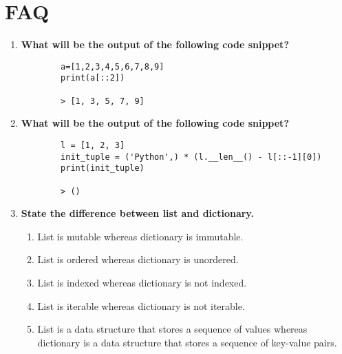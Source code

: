 \documentclass[11pt]{article}
\begin{document}
\clearpage

\section{FAQ}

\begin{enumerate}
	\item \textbf{What will be the output of the following code snippet?}\\
	      \begin{verbatim}
		a=[1,2,3,4,5,6,7,8,9]
		print(a[::2])

		> [1, 3, 5, 7, 9]
	\end{verbatim}
	\item \textbf{What will be the output of the following code snippet?}\\
	      \begin{verbatim}
		l = [1, 2, 3]
		init_tuple = ('Python',) * (l.__len__() - l[::-1][0])
		print(init_tuple)

		> ()
	\end{verbatim}

	\item \textbf{State the difference between list and dictionary.}\\
	      \begin{enumerate}
		      \item List is mutable whereas dictionary is immutable.
		      \item List is ordered whereas dictionary is unordered.
		      \item List is indexed whereas dictionary is not indexed.
		      \item List is iterable whereas dictionary is not iterable.
		      \item List is a data structure that stores a sequence of values whereas dictionary is a data structure that stores a sequence of key-value pairs.
	      \end{enumerate}

\end{enumerate}
\end{document}
